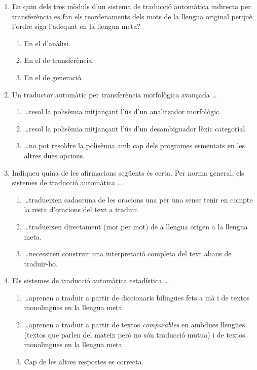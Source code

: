 \begin{enumerate}
\item En quin dels tres mòduls d'un sistema de traducció automàtica
  indirecta per transferència es fan els reordenaments dels mots de la
  llengua original perquè l'ordre siga l'adequat en la llengua meta?
  \begin{enumerate}
  \item En el d'anàlisi.
  \item En el de transferència.
  \item En el de generació.
  \end{enumerate}

\item Un traductor automàtic per transferència morfològica avançada
  \ldots 
  \begin{enumerate}
  \item \ldots resol la polisèmia mitjançant l'ús d'un analitzador
    morfològic.
  \item \ldots resol la polisèmia mitjançant l'ús d'un desambiguador
    lèxic categorial.
  \item \ldots no pot resoldre la polisèmia amb cap dels programes
    esmentats en les altres dues opcions.
  \end{enumerate}

\item Indiqueu quina de les afirmacions següents és certa. Per norma
  general, els sistemes de traducció automàtica \ldots
  \begin{enumerate}
  \item \ldots tradueixen cadascuna de les oracions una per una sense
    tenir en compte la resta d'oracions del text a traduir.
  \item \ldots tradueixen directament (mot per mot) de a llengua
    origen a la llengua meta.
  \item \ldots necessiten construir una interpretació completa del
    text abans de traduir-ho.
 \end{enumerate}

\item Els sistemes de traducció automàtica estadística \ldots
  \begin{enumerate}
  \item \ldots aprenen a traduir a partir de diccionaris bilingües
    fets a mà i de textos monolingües en la llengua meta.
  \item \ldots aprenen a traduir a partir de textos \emph{comparables}
    en ambdues llengües (textos que parlen del mateix però no són
    traducció mutua) i de textos monolingües en la llengua meta.
  \item Cap de les altres respostes es correcta.
  \end{enumerate} 


\end{enumerate}
